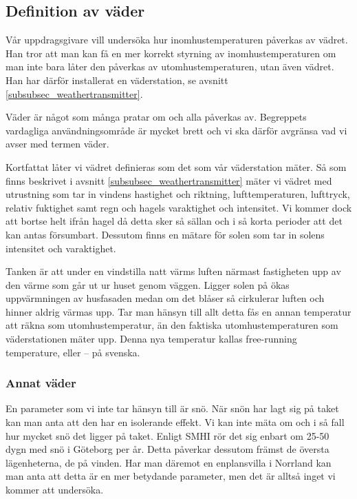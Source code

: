 \subsection{Definition av väder}
\label{subsec_weather}
Vår uppdragsgivare vill undersöka hur inomhustemperaturen påverkas av vädret. Han tror att man kan få en mer korrekt styrning av inomhustemperaturen om man inte bara låter den påverkas av utomhustemperaturen, utan även vädret. Han har därför installerat en väderstation, se avsnitt \ref{subsubsec_weathertransmitter}.

Väder är något som många pratar om och alla påverkas av. Begreppets vardagliga användningsområde är mycket brett och vi ska därför avgränsa vad vi avser med termen väder. 

Kortfattat låter vi vädret definieras som det som vår väderstation mäter. Så som finns beskrivet i avsnitt \ref{subsubsec_weathertransmitter} mäter vi vädret med utrustning som tar in vindens hastighet och riktning, lufttemperaturen, lufttryck, relativ fuktighet samt regn och hagels varaktighet och intensitet. Vi kommer dock att bortse helt ifrån hagel då detta sker så sällan och i så korta perioder att det kan antas försumbart.  Dessutom finns en mätare för solen som tar in solens intensitet och varaktighet. %

Tanken är att under en vindstilla natt värms luften närmast fastigheten upp av den värme som går ut ur huset genom väggen. Ligger solen på ökas uppvärmningen av husfasaden medan om det blåser så cirkulerar luften och hinner aldrig värmas upp. Tar man hänsyn till allt detta fås en annan temperatur att räkna som utomhustemperatur, än den faktiska utomhustemperaturen som väderstationen mäter upp. Denna nya temperatur kallas free-running temperature, eller -- på svenska. %



\subsubsection{Annat väder}
En parameter som vi inte tar hänsyn till är snö. När snön har lagt sig på taket kan man anta att den har en isolerande effekt. Vi kan inte mäta om och i så fall hur mycket snö det ligger på taket. Enligt SMHI %
rör det sig enbart om 25-50 dygn med snö i Göteborg per år. Detta påverkar dessutom främst de översta lägenheterna, de på vinden. Har man däremot en enplansvilla i Norrland kan man anta att detta är en mer betydande parameter, men det är alltså inget vi kommer att undersöka.

